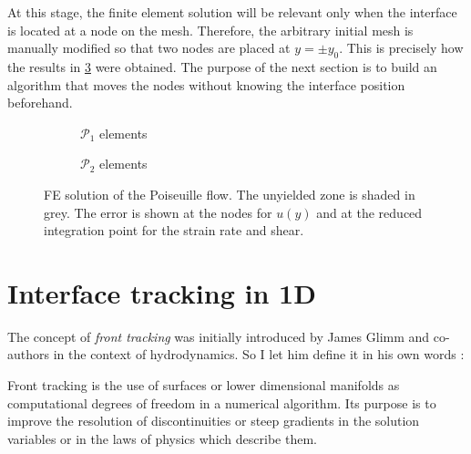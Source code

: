 \documentclass[11 pt]{report}
\begin{document}
At this stage, the finite element solution will be relevant only when the interface is located at a node on the mesh. Therefore, the arbitrary initial mesh is manually modified so that two nodes are placed at $y=\pm y_0$. This is precisely how the results in \cref{fig:poiseuille_1D_basic} were obtained. The purpose of the next section is to build an algorithm that moves the nodes without knowing the interface position beforehand.

\begin{figure}
    \centering
    \begin{subfigure}[t]{\textwidth}
        
        \vspace*{-12pt}
        \caption{$\mathcal{P}_1$ elements}
        \label{fig:results_1D_P1}
    \end{subfigure}\vspace{6pt}
    \begin{subfigure}[t]{\textwidth}
        \centering
        
        \vspace*{-12pt}
        \caption{$\mathcal{P}_2$ elements}
        \label{fig:results_1D_P2}
    \end{subfigure}\vspace{6pt}
    \caption{FE solution of the Poiseuille flow. The unyielded zone is shaded in grey. The error is shown at the nodes for $u(y)$ and at the reduced integration point for the strain rate and shear.}
    \label{fig:poiseuille_1D_basic}
\end{figure}


\section{Interface tracking in 1D}

The concept of \textit{front tracking} was initially introduced by James Glimm and co-authors \cite{chern1986front} in the context of hydrodynamics. So I let him define it in his own words \cite{SHE2016383}:
\begin{displayquote}
    Front tracking is the use of surfaces or lower dimensional manifolds as computational degrees of freedom in a numerical algorithm. Its purpose is to improve the resolution of discontinuities or steep gradients in the solution variables or in the laws of physics which describe them.
\end{displayquote}
\end{document}
